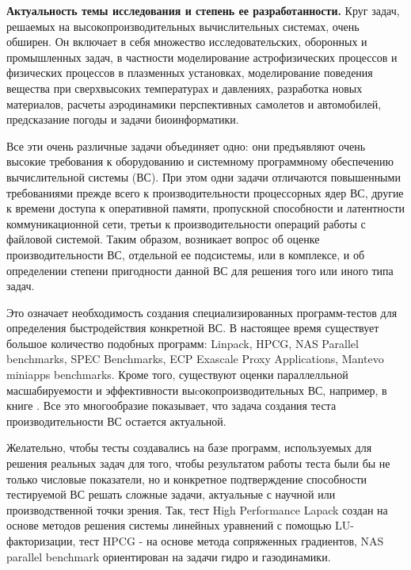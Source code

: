  \textbf{Актуальность темы исследования и степень ее
 разработанности.} Круг задач, решаемых на высокопроизводительных вычислительных системах, очень обширен. Он включает в себя множество исследовательских, оборонных и промышленных задач, в частности моделирование астрофизических процессов и физических процессов в плазменных установках, моделирование поведения вещества при сверхвысоких температурах и давлениях, разработка новых материалов, расчеты аэродинамики перспективных самолетов и автомобилей, предсказание погоды и задачи биоинформатики.
 
 Все эти очень различные задачи объединяет одно: они предъявляют очень высокие требования к оборудованию и системному программному обеспечению вычислительной системы (ВС). При этом одни задачи  отличаются повышенными требованиями прежде всего к производительности процессорных ядер ВС, другие к времени доступа к оперативной памяти, пропускной способности и латентности коммуникационной сети, третьи к производительности операций работы с файловой системой. Таким образом, возникает вопрос об оценке производительности ВС, отдельной ее подсистемы, или в комплексе, и об определении степени пригодности данной ВС для решения того или иного типа задач. 
 
 Это означает необходимость создания специализированных программ-тестов для определения быстродействия конкретной ВС. В настоящее время существует большое количество подобных программ: Linpack, HPCG, NAS Parallel benchmarks, SPEC Benchmarks, ECP Exascale Proxy Applications, Mantevo miniapps benchmarks. Кроме того, существуют оценки параллелльной масшабируемости и эффективности выcокопроизводительных ВС, например, в книге \cite{StepanenkoScaling}.
 Все это многообразие показывает, что задача создания теста производительности ВС остается актуальной.
 
 
 Желательно, чтобы тесты создавались на базе программ, используемых для решения реальных задач для того, чтобы результатом работы теста были бы не только числовые показатели, но и конкретное подтверждение способности тестируемой ВС решать сложные задачи, актуальные с научной или производственной точки зрения. Так, тест High Performance Lapack создан на основе методов решения системы линейных уравнений с помощью LU-факторизации, тест HPCG - на основе метода сопряженных градиентов, NAS parallel benchmark ориентирован на задачи гидро и газодинамики.
 
 
 
